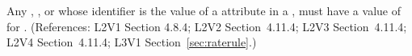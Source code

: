 Any \Compartment, \Species, \Parameter or \SpeciesReference whose identifier is the value of a
 attribute in a \RateRule, must have a value of 
for .  (References: L2V1 Section 4.8.4; L2V2 Section~4.11.4;
L2V3 Section~4.11.4; L2V4 Section~4.11.4; L3V1 Section~\ref{sec:raterule}.)
